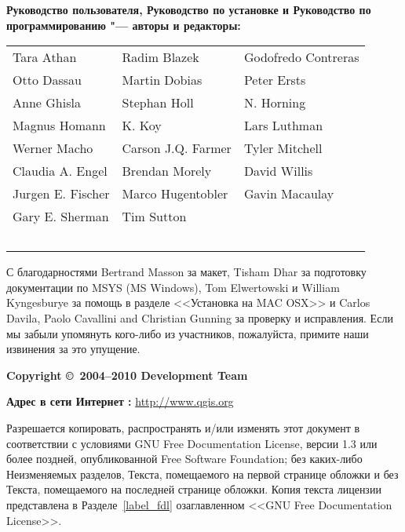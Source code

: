 \newpage

\begin{flushleft}
\textbf{Руководство пользователя, Руководство по установке и Руководство
по программированию "--- авторы и редакторы:}
  \par\bigskip\noindent
\begin{tabular}{p{4cm} p{4cm} p{4cm}}
Tara Athan & Radim Blazek & Godofredo Contreras \\
Otto Dassau & Martin Dobias & Peter Ersts \\
Anne Ghisla & Stephan Holl & N. Horning \\
Magnus Homann & K. Koy & Lars Luthman \\
Werner Macho & Carson J.Q. Farmer & Tyler Mitchell \\
Claudia A. Engel & Brendan Morely & David Willis \\
Jurgen E. Fischer & Marco Hugentobler & Gavin Macaulay \\
Gary E. Sherman & Tim Sutton \\ \
\end{tabular}
\end{flushleft}

С благодарностями Bertrand Masson за макет, Tisham Dhar за подготовку
документации по MSYS (MS Windows), Tom Elwertowski и William Kyngesburye
за помощь в разделе <<Установка на MAC OSX>> и Carlos Davila, Paolo
Cavallini and Christian Gunning за проверку и исправления. Если мы
забыли упомянуть кого-либо из участников, пожалуйста, примите наши
извинения за это упущение.
\par\bigskip\noindent
\textbf{Copyright \copyright~2004--2010 \QG Development Team}
\par\bigskip\noindent
\textbf{Адрес в сети Интернет :} \url{http://www.qgis.org}

\newpage


Разрешается копировать, распространять и/или изменять этот документ в
соответствии с условиями GNU Free Documentation License, версии 1.3 или
более поздней, опубликованной Free Software Foundation; без каких-либо
Неизменяемых разделов, Текста, помещаемого на первой странице обложки и
без Текста, помещаемого на последней странице обложки. Копия текста
лицензии представлена в Разделе~\ref{label_fdl} озаглавленном <<GNU Free
Documentation License>>.
